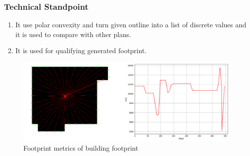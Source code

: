                         \subsubsection{Technical Standpoint}
                        \begin{enumerate}[label=\alph*.]
                                \item It use polar convexity and turn given outline into a list of discrete values and it is used to compare with other plans.
                                \item It is used for qualifying generated footprint.
                        \end{enumerate}
                        \begin{figure}[h]
                                \centering
                                \includegraphics[width=1\textwidth]{img/chapter_6/qualify_footprint.png}
                                \caption{Footprint metrics of building footprint}
                                \label{fig: qualify_footprint}
                        \end{figure}
